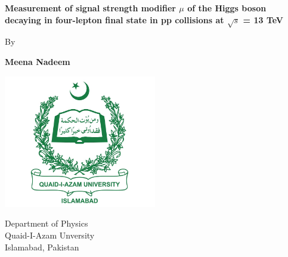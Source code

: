 \begin{titlepage}
    \begin{center}
        \vspace*{1cm}
            
        \Huge
        \textbf{Measurement of signal strength modifier $\mu$ of the Higgs boson decaying in four-lepton final state in pp collisions at $\sqrt{s}$ = 13 TeV}
            
        \vspace{0.5cm}
        \LARGE
        By
            
        \vspace{1cm}
            
        \textbf{Meena Nadeem}
            
        \vfill
            
       
        \vspace{0.8cm}
            
        \includegraphics[width=0.5\textwidth]{images/QAU-PIC.jpg}
            
        \Large
        Department of Physics\\
        Quaid-I-Azam Unversity\\
        Islamabad, Pakistan\\
            
    \end{center}
\end{titlepage}
